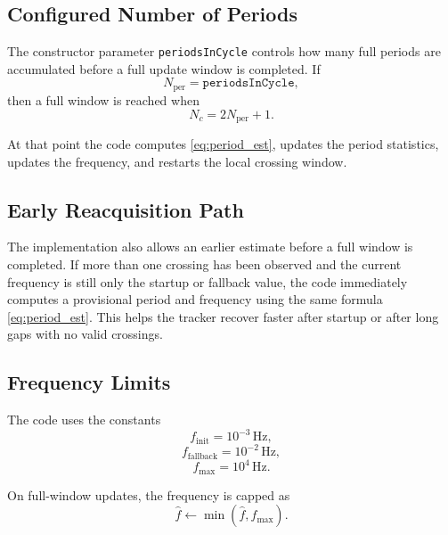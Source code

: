 \documentclass[conference]{IEEEtran}
\begin{document}
\subsection{Configured Number of Periods}

The constructor parameter \texttt{periodsInCycle} controls how many full
periods are accumulated before a full update window is completed. If
\begin{equation}
  N_{\mathrm{per}} = \texttt{periodsInCycle},
\end{equation}
then a full window is reached when
\begin{equation}
  N_c = 2N_{\mathrm{per}} + 1.
\end{equation}

At that point the code computes \eqref{eq:period_est}, updates the period
statistics, updates the frequency, and restarts the local crossing window.

\subsection{Early Reacquisition Path}

The implementation also allows an earlier estimate before a full window is
completed. If more than one crossing has been observed and the current
frequency is still only the startup or fallback value, the code immediately
computes a provisional period and frequency using the same formula
\eqref{eq:period_est}. This helps the tracker recover faster after startup or
after long gaps with no valid crossings.

\subsection{Frequency Limits}

The code uses the constants
\begin{equation}
  f_{\mathrm{init}} = 10^{-3}\,\text{Hz},
\end{equation}
\begin{equation}
  f_{\mathrm{fallback}} = 10^{-2}\,\text{Hz},
\end{equation}
\begin{equation}
  f_{\max} = 10^{4}\,\text{Hz}.
\end{equation}

On full-window updates, the frequency is capped as
\begin{equation}
  \hat f \leftarrow \min(\hat f, f_{\max}).
\end{equation}
\end{document}
